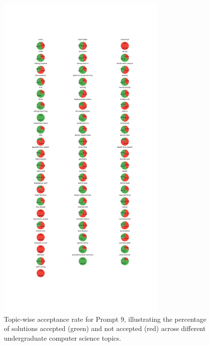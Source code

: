 \begin{figure}[H]
    \centering
    \includegraphics[width=0.75\textwidth, height=0.7\textheight]{figures/9/accepted_not_topicwise.jpg}
    \caption{Topic-wise acceptance rate for Prompt 9, illustrating the percentage of solutions accepted (green) and not accepted (red) across different undergraduate computer science topics.}
    \label{fig:topic_wise_acceptance_prompt_9}
\end{figure}
